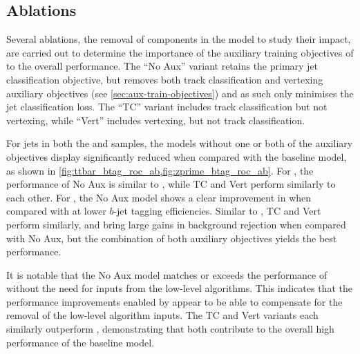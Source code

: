 \subsection{Ablations}\label{sec:gnn_ablations}

Several ablations, the removal of components in the model to study their impact, are carried out to determine the importance of the auxiliary training objectives of \GNN to the overall performance.
The ``\GNN No Aux'' variant retains the primary jet classification objective, but removes both track classification and vertexing auxiliary objectives (see \cref{sec:aux-train-objectives}) and as such only minimises the jet classification loss.
The ``\GNN TC'' variant includes track classification but not vertexing, while ``\GNN Vert'' includes vertexing, but not track classification.

For jets in both the \ttbar and \Zprime samples, the models without one or both of the auxiliary objectives display significantly reduced \clrej when compared with the baseline \GNN model, as shown in \cref{fig:ttbar_btag_roc_ab,fig:zprime_btag_roc_ab}.
For \ttbarjets, the performance of \GNN No Aux is similar to \DLr, while \GNN TC and \GNN Vert perform similarly to each other.
For \Zprimejets, the \GNN No Aux model shows a clear improvement in \clrej when compared with \DLr at lower $b$-jet tagging efficiencies.
Similar to \ttbarjets, \GNN TC and \GNN Vert perform similarly, and bring large gains in background rejection when compared with \GNN No Aux, but the combination of both auxiliary objectives yields the best performance.

It is notable that the \GNN No Aux model matches or exceeds the performance of \DLr without the need for inputs from the low-level algorithms.
This indicates that the performance improvements enabled by \GNN appear to be able to compensate for the removal of the low-level algorithm inputs.
The \GNN TC and \GNN Vert variants each similarly outperform \DLr, demonstrating that both contribute to the overall high performance of the baseline model.


